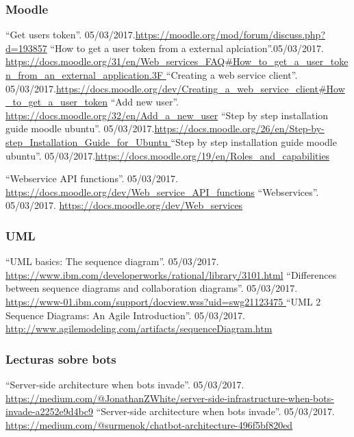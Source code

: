 \documentclass[a4paper,11pt]{book}
\begin{document}

\begin{thebibliography}{99}

	
\subsubsection*{Moodle}

 ``Get users token''. 05/03/2017.\url{https://moodle.org/mod/forum/discuss.php?d=193857}
 ``How to get a user token from a external aplciation''.05/03/2017. \url{https://docs.moodle.org/31/en/Web_services_FAQ#How_to_get_a_user_token_from_an_external_application.3F
}
 ``Creating a web service client''. 05/03/2017.\url{https://docs.moodle.org/dev/Creating_a_web_service_client#How_to_get_a_user_token}
 ``Add new user''. \url{https://docs.moodle.org/32/en/Add_a_new_user}
 ``Step by step installation guide moodle ubuntu''. 05/03/2017.\url{https://docs.moodle.org/26/en/Step-by-step_Installation_Guide_for_Ubuntu
}
 ``Step by step installation guide moodle ubuntu''. 05/03/2017.\url{https://docs.moodle.org/19/en/Roles_and_capabilities}

 ``Webservice API functions''. 05/03/2017. \url{https://docs.moodle.org/dev/Web_service_API_functions}
 ``Webservices''. 05/03/2017. \url{https://docs.moodle.org/dev/Web_services}

\subsubsection*{UML}
 ``UML basics: The sequence diagram''. 05/03/2017. \url{https://www.ibm.com/developerworks/rational/library/3101.html}
 ``Differences between sequence diagrams and collaboration diagrams''. 05/03/2017. \url{https://www-01.ibm.com/support/docview.wss?uid=swg21123475
}
 ``UML 2 Sequence Diagrams: An Agile Introduction''. 05/03/2017. \url{http://www.agilemodeling.com/artifacts/sequenceDiagram.htm
}
\subsubsection*{Lecturas sobre bots}
 ``Server-side architecture when bots invade''. 05/03/2017. \url{https://medium.com/@JonathanZWhite/server-side-infrastructure-when-bots-invade-a2252e9d4bc9}
 ``Server-side architecture when bots invade''. 05/03/2017. \url{https://medium.com/@surmenok/chatbot-architecture-496f5bf820ed
}



\end{thebibliography}
\end{document}
